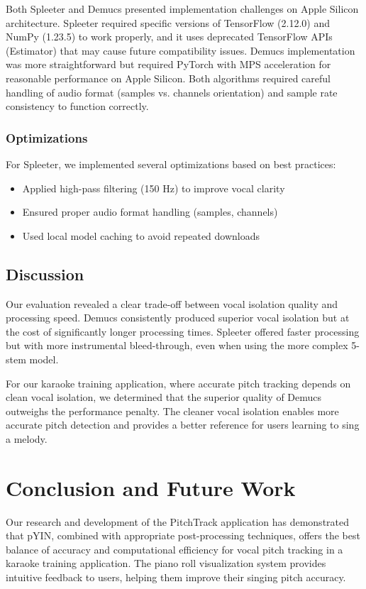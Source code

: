 \documentclass[conference]{IEEEtran}
\begin{document}
Both Spleeter and Demucs presented implementation challenges on Apple Silicon architecture. Spleeter required specific versions of TensorFlow (2.12.0) and NumPy (1.23.5) to work properly, and it uses deprecated TensorFlow APIs (Estimator) that may cause future compatibility issues. Demucs implementation was more straightforward but required PyTorch with MPS acceleration for reasonable performance on Apple Silicon. Both algorithms required careful handling of audio format (samples vs. channels orientation) and sample rate consistency to function correctly.

\subsubsection{Optimizations}
For Spleeter, we implemented several optimizations based on best practices:
\begin{itemize}
    \item Applied high-pass filtering (150 Hz) to improve vocal clarity
    \item Ensured proper audio format handling (samples, channels)
    \item Used local model caching to avoid repeated downloads
\end{itemize}

\subsection{Discussion}
Our evaluation revealed a clear trade-off between vocal isolation quality and processing speed. Demucs consistently produced superior vocal isolation but at the cost of significantly longer processing times. Spleeter offered faster processing but with more instrumental bleed-through, even when using the more complex 5-stem model.

For our karaoke training application, where accurate pitch tracking depends on clean vocal isolation, we determined that the superior quality of Demucs outweighs the performance penalty. The cleaner vocal isolation enables more accurate pitch detection and provides a better reference for users learning to sing a melody.

\section{Conclusion and Future Work}
Our research and development of the PitchTrack application has demonstrated that pYIN, combined with appropriate post-processing techniques, offers the best balance of accuracy and computational efficiency for vocal pitch tracking in a karaoke training application. The piano roll visualization system provides intuitive feedback to users, helping them improve their singing pitch accuracy.
\end{document}
